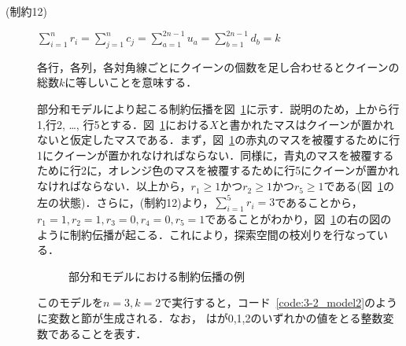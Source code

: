 \begin{description}
 \item[(制約12)] $\sum\limits_{i=1}^{n} r_{i} = \sum\limits_{j=1}^{n} c_{j} =\sum\limits_{a=1}^{2n-1} u_{a} =\sum\limits_{b=1}^{2n-1} d_{b} = k$ \par
各行，各列，各対角線ごとにクイーンの個数を足し合わせるとクイーンの総数$k$に等しいことを意味する．\par

部分和モデルにより起こる制約伝播を図~\ref{fig:constraint}に示す．説明のため，上から行1,行2, \dots , 行5とする．図~\ref{fig:constraint}における$X$と書かれたマスはクイーンが置かれないと仮定したマスである．まず，図~\ref{fig:constraint}の赤丸のマスを被覆するために行1にクイーンが置かれなければならない．同様に，青丸のマスを被覆するために行2に，オレンジ色のマスを被覆するために行5にクイーンが置かれなければならない．以上から，$r_1 \geq 1$かつ$r_2 \geq 1$かつ$r_5 \geq 1$である(図~\ref{fig:constraint}の左の状態)．さらに，(制約12)より，$\sum\limits _{i=1}^{5} r_i = 3$であることから，$r_1 = 1,r_2=1,r_3=0,r_4=0,r_5=1$であることがわかり，図~\ref{fig:constraint}の右の図のように制約伝播が起こる．これにより，探索空間の枝刈りを行なっている．

\begin{figure}[htb]
 \begin{minipage}[b]{0.45\linewidth}
  \centering
  
 \end{minipage}
 \begin{minipage}[b]{0.45\linewidth}
  
 \end{minipage}
 \caption{部分和モデルにおける制約伝播の例}
 \label{fig:constraint}
\end{figure}

このモデルを$n=3,k=2$で実行すると，コード~\ref{code:3-2_model2}のように変数と節が生成される．なお，  はが0,1,2のいずれかの値をとる整数変数であることを表す．


\end{description}